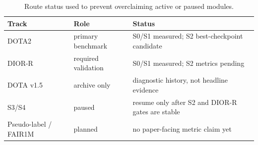 \begin{table}[t]
\centering
\small
\caption{Route status used to prevent overclaiming active or paused modules.}
\label{tab:route_status}
\begin{tabular}{lll}
\toprule
Track & Role & Status \\
\midrule
DOTA2 & primary benchmark & S0/S1 measured; S2 best-checkpoint candidate \\
DIOR-R & required validation & S0/S1 measured; S2 metrics pending \\
DOTA v1.5 & archive only & diagnostic history, not headline evidence \\
S3/S4 & paused & resume only after S2 and DIOR-R gates are stable \\
Pseudo-label / FAIR1M & planned & no paper-facing metric claim yet \\
\bottomrule
\end{tabular}
\end{table}

